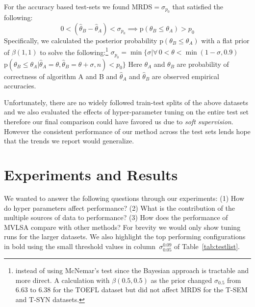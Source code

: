 \documentclass[11pt]{article}
\begin{document}
For the accuracy based test-sets we found MRDS$=\sigma_{p_0}$ that satisfied
the following:
{\small $$ 0< (\hat{\theta}_{B} - \hat{\theta}_{A})<\sigma_{p_0}
  {\implies} \text{p}(\theta_{B} \le \theta_{A}) > p_0$$}
Specifically, we calculated the posterior probability
$\text{p}(\theta_{B} \le \theta_{A})$ with a flat prior of
$\beta(1,1)$ to solve the following:\footnote{instead of using  McNemar's test
  \cite{mcnemar1947note} since the Bayesian approach is tractable and
  more direct. A calculation with $\beta(0.5, 0.5)$ as the prior
  changed $\sigma_{0.5}$ from 6.63 to 6.38 for the TOEFL dataset but
  did not affect MRDS for the T-SEM and T-SYN datasets.}
{\small $\sigma_{p_0}=\min\{\sigma |\forall\,
  0{<}\theta{<}\min(1{-}\sigma,0.9)\,$
  $\text{p}(\theta_{B}{\le} \theta_{A}| \hat{\theta}_A{=}\theta,
\hat{\theta}_B{=}\theta+\sigma, n) < p_0\}$}
Here $\theta_{A}$ and $\theta_{B}$ are probability of correctness of
algorithm A and B and $\hat{\theta}_{A}$ and $\hat{\theta}_{B}$ are
observed empirical accuracies.

Unfortunately, there are no widely followed train-test splits of the above
datasets and we also evaluated the effects of hyper-parameter tuning
on the entire test set therefore our final comparison could have
favored us due to \emph{soft supervision}. 
However the consistent performance of our
method across the test sets lends hope that the trends we report would
generalize.


\section{Experiments and Results}
\label{sec:exp}
We wanted to answer the following questions through our experiments:
(1) How do hyper parameters affect performance? (2) What is the
contribution of the multiple sources of data to performance? (3) How
does the performance of MVLSA compare with other methods? For brevity we would only show
tuning runs for the larger datasets. We also highlight
the top performing configurations in bold using the small threshold
values in column~$\sigma_{0.05}^{0.09}$ of Table~\ref{tab:testlist}.
\end{document}

